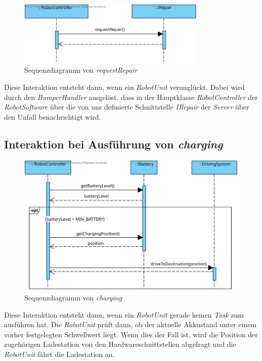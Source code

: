\begin{figure}[H]
	\centering
	\includegraphics[width=0.81\textwidth]{img/8-requestRepair}
	\caption{Sequenzdiagramm von \emph{requestRepair}}
	\label{requestRepairInteraktion}
\end{figure}

Diese Interaktion entsteht dann, wenn ein \textit{RobotUnit} verunglückt. Dabei wird durch den \textit{BumperHandler} ausgelöst, dass in der Hauptklasse \textit{RobotController} der \textit{RobotSoftware} über die von uns definierte Schnittstelle \textit{IRepair} der \textit{Server} über den Unfall benachrichtigt wird.\\

\subsection*{Interaktion bei Ausführung von \textit{charging}}

\begin{figure}[H]
	\centering
	\includegraphics[width=1\textwidth]{img/0-Entwurf-8-Charging}
	\caption{Sequenzdiagramm von \emph{charging}}
	\label{chargingInteraktion}
\end{figure}

Diese Interaktion entsteht dann, wenn ein \textit{RobotUnit} gerade keinen \textit{Task} zum ausführen hat. Die \textit{RobotUnit} prüft dann, ob der aktuelle Akkustand unter einem vorher festgelegten Schwellwert liegt. Wenn dies der Fall ist, wird die Position der zugehörigen Ladestation von den Hardwareschnittstellen abgefragt und die \textit{RobotUnit} fährt die Ladestation an. \\
